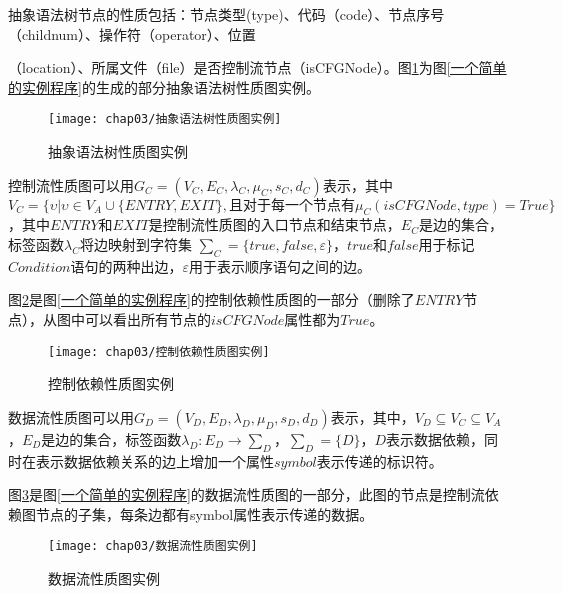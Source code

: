 抽象语法树节点的性质包括：节点类型{(type)}、代码{（code）}、节点序号{（childnum）}、操作符{（operator）}、位置{（location）、所属文件{（file）}是否控制流节点{（isCFGNode）}。图\ref{抽象语法树性质图实例}为图\ref{一个简单的实例程序}的生成的部分抽象语法树性质图实例。

\begin{figure}[htp]
\centering
\texttt{[image: chap03/抽象语法树性质图实例]}
\caption{抽象语法树性质图实例}
\label{抽象语法树性质图实例}
\end{figure}

\begin{definition}
\label{控制流性质图定义}
控制流性质图可以用$G _{C}=(V_{C},E_{C},\lambda _{C}, \mu _{C}, s _{C}, d _{C})$表示，其中$V_{C}=\{ \upsilon | \upsilon \in V_{A} \cup \{ENTRY,EXIT\},\text{且} 对于每一个节点有\mu_C(isCFGNode, type)=True \}$，其中$ENTRY$和$EXIT$是控制流性质图的入口节点和结束节点，$E_{C}$是边的集合，标签函数$\lambda_C$将边映射到字符集 $\sum_C=\{true, false, \varepsilon \}$，$true$和$false$用于标记$Condition$语句的两种出边，$\varepsilon$用于表示顺序语句之间的边。
\end{definition}

图\ref{控制依赖性质图实例}是图\ref{一个简单的实例程序}的控制依赖性质图的一部分（删除了$ENTRY$节点），从图中可以看出所有节点的$isCFGNode$属性都为$True$。

\begin{figure}[htp]
\centering
\texttt{[image: chap03/控制依赖性质图实例]}
\caption{控制依赖性质图实例}
\label{控制依赖性质图实例}
\end{figure}

\begin{definition}
\label{数据流性质图定义}
数据流性质图可以用$G _{D}=(V_{D},E_{D},\lambda _{D}, \mu _{D}, s _{D}, d _{D})$表示，其中，$V_{D} \subseteq V_C \subseteq V_A$，$E_{D}$是边的集合，标签函数$\lambda_{D} : E_{D} \rightarrow \sum_{D}$，$\sum_{D} = \{D\}$，$D$表示数据依赖，同时在表示数据依赖关系的边上增加一个属性$symbol$表示传递的标识符。
\end{definition}

图\ref{数据流性质图实例}是图\ref{一个简单的实例程序}的数据流性质图的一部分，此图的节点是控制流依赖图节点的子集，每条边都有symbol属性表示传递的数据。

\begin{figure}[htp]
\centering
\texttt{[image: chap03/数据流性质图实例]}
\caption{数据流性质图实例}
\label{数据流性质图实例}
\end{figure}

}
